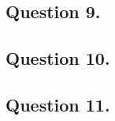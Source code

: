 \documentclass{mhk}
\begin{document}
\subsection*{Question 9.}





\subsection*{Question 10.}






\subsection*{Question 11.}




\end{document}
